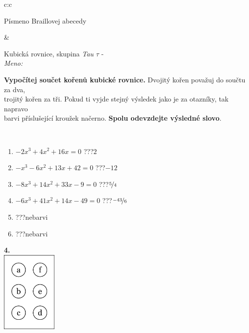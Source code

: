 \documentclass[10pt]{report}
\begin{document}
\begin{tabular}{c:c}
\begin{minipage}[c][104.5mm][t]{0.5\linewidth}
\begin{center}
\begin{minipage}{0.20\linewidth}
\begin{center}
{\small Písmeno Braillovej abecedy}
\end{center}
\end{minipage}
\end{center}
\end{minipage}
&
\begin{minipage}[c][104.5mm][t]{0.5\linewidth}
\begin{center}
\vspace{7mm}
{\huge Kubická rovnice, skupina \textit{Tau $\tau$} -}\\[5mm]
\textit{Meno:}\phantom{xxxxxxxxxxxxxxxxxxxxxxxxxxxxxxxxxxxxxxxxxxxxxxxxxxxxxxxxxxxxxxxxx}\\[5mm]
\begin{minipage}{0.95\linewidth}
\textbf{Vypočítej součet kořenů kubické rovnice.} Dvojitý kořen považuj do součtu za dva,\\trojitý kořen za tři. Pokud ti vyjde stejný výsledek jako je za otazníky, tak napravo\\barvi příslušející kroužek načerno. \textbf{Spolu odevzdejte výsledné slovo}.
\end{minipage}
\\[1mm]
\begin{minipage}{0.79\linewidth}
\begin{center}
\begin{varwidth}{\linewidth}
\begin{enumerate}
\Large
\item $-2x^3+4x^2+16x=0$\quad \dotfill\; ???\;\dotfill \quad $2$
\item $-x^3-6x^2+13x+42=0$\quad \dotfill\; ???\;\dotfill \quad $-12$
\item $-8x^3+14x^2+33x-9=0$\quad \dotfill\; ???\;\dotfill \quad $\nicefrac{5}{4}$
\item $-6x^3+41x^2+14x-49=0$\quad \dotfill\; ???\;\dotfill \quad $\nicefrac{-43}{6}$
\item \quad \dotfill\; ???\;\dotfill \quad nebarvi
\item \quad \dotfill\; ???\;\dotfill \quad nebarvi
\end{enumerate}
\end{varwidth}
\end{center}
\end{minipage}
\begin{minipage}{0.20\linewidth}
\begin{center}
{\Huge\bfseries 4.} \\[2mm]
\includegraphics[height=40mm]{../images/braille.png}

\end{center}
\end{minipage}
\end{center}
\end{minipage}
\end{tabular}
\end{document}
